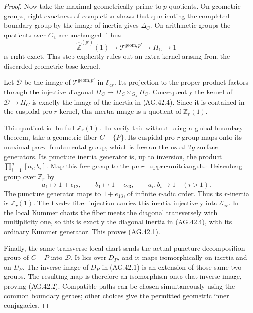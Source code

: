\begin{proof}
Now take the maximal geometrically prime-to-\(p\)
quotients. On geometric groups, right exactness of
completion shows that quotienting the completed
boundary group by the image of inertia gives
\(\Delta_C\). On arithmetic groups the quotients
over \(G_k\) are unchanged. Thus
\[
 \widehat{\mathbb Z}^{(p')}(1)\longrightarrow
 \mathcal T^{\mathrm{geom},p'}\longrightarrow
 \Pi_C\longrightarrow1                             \tag{AG.42.4}
\]
is right exact. This step explicitly rules out an extra
kernel arising from the discarded geometric base kernel.

Let \(\mathcal D\) be the image of
\(\mathcal T^{\mathrm{geom},p'}\) in
\(\mathcal E_{\mathrm{c}r}\). Its projection to the
proper product factors through the injective diagonal
\(\Pi_C\to\Pi_C\times_{G_k}\Pi_C\).
Consequently the kernel of \(\mathcal D\to\Pi_C\)
is exactly the image of the inertia in (AG.42.4).
Since it is contained in the cuspidal pro-\(r\) kernel,
this inertia image is a quotient of \(\mathbb Z_r(1)\).

This quotient is the full \(\mathbb Z_r(1)\).
To verify this without using a global boundary theorem,
take a geometric fiber \(C-\{P\}\). Its cuspidal
pro-\(r\) group maps onto its maximal pro-\(r\)
fundamental group, which is free on the usual
\(2g\) surface generators. Its puncture inertia
generator is, up to inversion, the product
\(\prod_{i=1}^g[a_i,b_i]\). Map this free group to
the pro-\(r\) upper-unitriangular Heisenberg group
over \(\mathbb Z_r\) by
\[
 a_1\longmapsto 1+e_{12},\qquad
 b_1\longmapsto 1+e_{23},\qquad
 a_i,b_i\longmapsto1\quad(i>1).
                                                        \tag{AG.42.5}
\]
The puncture generator maps to \(1+e_{13}\), of
infinite \(r\)-adic order. Thus its \(r\)-inertia
is \(\mathbb Z_r(1)\). The fixed-\(r\) fiber
injection carries this inertia injectively into
\(\mathcal E_{\mathrm{c}r}\). In the local Kummer
charts the fiber meets the diagonal transversely
with multiplicity one, so this is exactly the
diagonal inertia in (AG.42.4), with its ordinary
Kummer generator. This proves (AG.42.1).

Finally, the same transverse local chart sends the
actual puncture decomposition group of \(C-P\)
into \(\mathcal D\). It lies over \(D_P\), and
it maps isomorphically on inertia and on \(D_P\).
The inverse image of \(D_P\) in (AG.42.1) is an
extension of those same two groups. The resulting
map is therefore an isomorphism onto that inverse
image, proving (AG.42.2). Compatible paths can be chosen
simultaneously using the common boundary gerbes;
other choices give the permitted geometric inner
conjugacies.


\end{proof}

